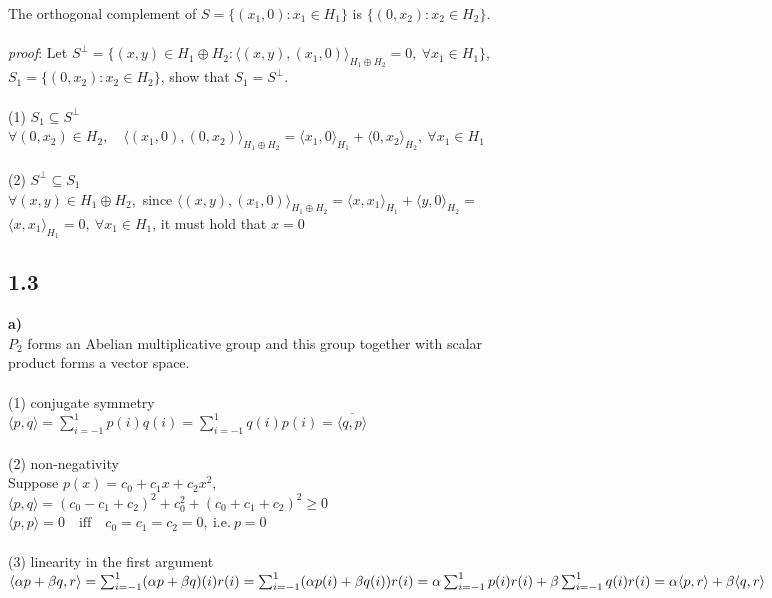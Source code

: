 \documentclass[12pt,a4paper,titlepage]{article}
\begin{document}
The orthogonal complement of $S=\{(x_1,0):x_1\in H_1\}$ is $\{(0,x_2):x_2\in H_2\}$.\\\\
\textit{proof}: Let $S^\bot=\{(x,y)\in H_1 \oplus H_2: \langle (x,y),(x_1,0) \rangle_{H_1 \oplus H_2}=0,\: \forall x_1 \in H_1 \}$, \\ 
$S_1=\{(0,x_2):x_2\in H_2\}$, show that $S_1=S^\bot$.\\\\
(1) $S_1 \subseteq S^\bot$\\
$\forall (0,x_2)\in H_2,\quad \langle (x_1,0),(0,x_2) \rangle_{H_1 \oplus H_2} 
 = \langle x_1,0 \rangle_{H_1} + \langle 0,x_2 \rangle_{H_2},\: \forall x_1 \in H_1$\\\\
(2) $S^\bot \subseteq S_1$\\
$\forall (x,y)\in H_1 \oplus H_2,$ since $\langle (x,y),(x_1,0) \rangle_{H_1 \oplus H_2} = \langle x,x_1 \rangle_{H_1} + \langle y,0 \rangle_{H_2}=$\\
$\langle x,x_1 \rangle_{H_1}=0, \: \forall x_1 \in H_1$, it must hold that $x=0$

\subsection*{1.3}
\textbf{a)}\\
$P_2$ forms an Abelian multiplicative group and this group together with scalar\\ product forms a vector space.\\\\
(1) conjugate symmetry\\
$\langle p,q \rangle = \sum_{i=-1}^1 p(i)q(i) = \sum_{i=-1}^1 q(i)p(i) = \overline{\langle q,p \rangle}$\\\\
(2) non-negativity\\
Suppose $p(x)=c_0+c_1 x+c_2 x^2$,\\
$\langle p,q\rangle=(c_0-c_1+c_2)^2+c_0^2+(c_0+c_1+c_2)^2 \geq 0$\\
$\langle p,p\rangle=0 \quad \text{iff}\quad c_0=c_1=c_2=0, \: \text{i.e.} \: p=0$\\\\
(3) linearity in the first argument\\
$\langle \alpha p+\beta q,r\rangle 
 = \sum_{i=-1}^1 (\alpha p+\beta q)(i)r(i)
 = \sum_{i=-1}^1 (\alpha p(i)+\beta q(i))r(i)\\
 = \alpha \sum_{i=-1}^1 p(i)r(i) + \beta \sum_{i=-1}^1 q(i)r(i)
 = \alpha \langle p,r\rangle + \beta \langle q,r\rangle$\\\\
\end{document}
